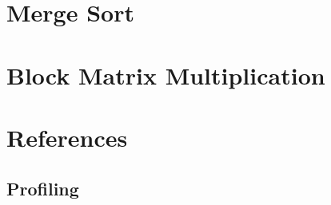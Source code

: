 \section{Merge Sort}
\label{sec:locality-performance-merge-sort}


\section{Block Matrix Multiplication}
\label{sec:locality-performance-block-matrix-multiplication}


\section{References}

\subsection{Profiling}


